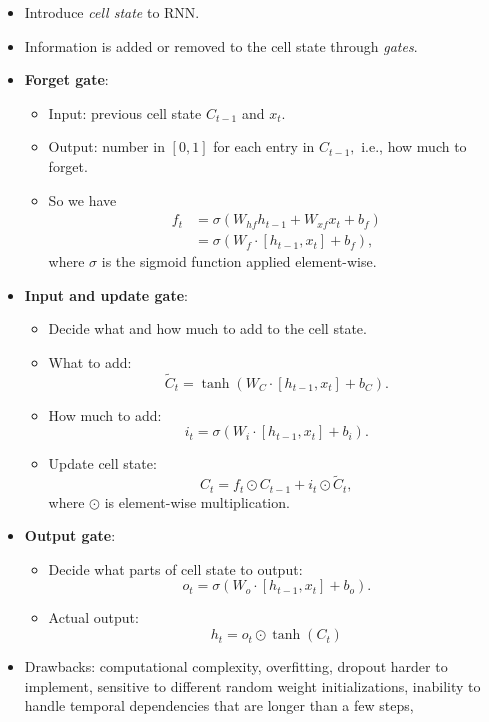 \begin{itemize}
\item 
Introduce \textit{cell state} to RNN.

\item
Information is added or removed to the cell state through \textit{gates}.

\item 
\textbf{Forget gate}:
	\begin{itemize}
	\item Input: previous cell state $C_{t-1}$ and $x_t.$
	\item Output: number in $[0,1]$ for each entry in $C_{t-1},$ i.e., how much to forget.
	\item So we have
		\begin{align*}
		f_t &=  \sigma(W_{hf}h_{t-1} + W_{xf}x_t + b_f)\\
		    &=\sigma ( W_f \cdot [h_{t-1}, x_t] + b_f),
		\end{align*}
	where $\sigma$ is the sigmoid function applied element-wise.
	\end{itemize}

\item 
\textbf{Input and update gate}:
	\begin{itemize}
	\item 
	Decide what and how much to add to the cell state.
	
	\item 
	What to add: \[ \tilde{C}_t = \tanh(W_C \cdot [h_{t-1}, x_t] + b_C). \]
	
	\item 
	How much to add: \[ i_t = \sigma(W_i \cdot [h_{t-1}, x_t] + b_i). \]
	
	\item 
	Update cell state: \[ C_t = f_t \odot C_{t-1} + i_t \odot \tilde{C}_t, \] where $\odot$ is element-wise multiplication.
	\end{itemize}

\item 
\textbf{Output gate}:
	\begin{itemize}
	\item 
	Decide what parts of cell state to output: \[ o_t = \sigma(W_o \cdot [h_{t-1}, x_t] + b_o). \]
	
	\item 
	Actual output: \[ h_t = o_t \odot \tanh(C_t) \]
	\end{itemize}

\item 
Drawbacks: computational complexity, overfitting, dropout harder to implement, sensitive to different random weight initializations, inability to handle temporal dependencies that are longer than a few steps, 

\end{itemize}

